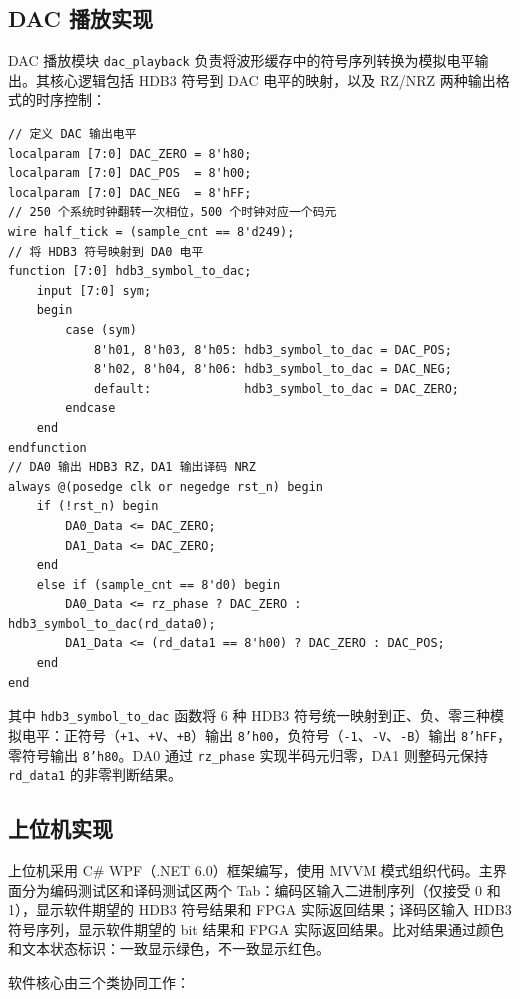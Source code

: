 \documentclass[UTF8,a4paper,12pt]{ctexart}
\begin{document}
\subsection{DAC 播放实现}

DAC 播放模块 \texttt{dac\_playback} 负责将波形缓存中的符号序列转换为模拟电平输出。其核心逻辑包括 HDB3 符号到 DAC 电平的映射，以及 RZ/NRZ 两种输出格式的时序控制：

\begin{lstlisting}[style=VerilogStyle,caption={DAC 码元播放与电平映射核心},label={lst:dac_core}]
// 定义 DAC 输出电平
localparam [7:0] DAC_ZERO = 8'h80;
localparam [7:0] DAC_POS  = 8'h00;
localparam [7:0] DAC_NEG  = 8'hFF;
// 250 个系统时钟翻转一次相位，500 个时钟对应一个码元
wire half_tick = (sample_cnt == 8'd249);
// 将 HDB3 符号映射到 DA0 电平
function [7:0] hdb3_symbol_to_dac;
    input [7:0] sym;
    begin
        case (sym)
            8'h01, 8'h03, 8'h05: hdb3_symbol_to_dac = DAC_POS;
            8'h02, 8'h04, 8'h06: hdb3_symbol_to_dac = DAC_NEG;
            default:             hdb3_symbol_to_dac = DAC_ZERO;
        endcase
    end
endfunction
// DA0 输出 HDB3 RZ，DA1 输出译码 NRZ
always @(posedge clk or negedge rst_n) begin
    if (!rst_n) begin
        DA0_Data <= DAC_ZERO;
        DA1_Data <= DAC_ZERO;
    end
    else if (sample_cnt == 8'd0) begin
        DA0_Data <= rz_phase ? DAC_ZERO : hdb3_symbol_to_dac(rd_data0);
        DA1_Data <= (rd_data1 == 8'h00) ? DAC_ZERO : DAC_POS;
    end
end
\end{lstlisting}

其中 \texttt{hdb3\_symbol\_to\_dac} 函数将 6 种 HDB3 符号统一映射到正、负、零三种模拟电平：正符号（\texttt{+1}、\texttt{+V}、\texttt{+B}）输出 \texttt{8'h00}，负符号（\texttt{-1}、\texttt{-V}、\texttt{-B}）输出 \texttt{8'hFF}，零符号输出 \texttt{8'h80}。DA0 通过 \texttt{rz\_phase} 实现半码元归零，DA1 则整码元保持 \texttt{rd\_data1} 的非零判断结果。


\subsection{上位机实现}

上位机采用 C\# WPF（.NET 6.0）框架编写，使用 MVVM 模式组织代码。主界面分为编码测试区和译码测试区两个 Tab：编码区输入二进制序列（仅接受 0 和 1），显示软件期望的 HDB3 符号结果和 FPGA 实际返回结果；译码区输入 HDB3 符号序列，显示软件期望的 bit 结果和 FPGA 实际返回结果。比对结果通过颜色和文本状态标识：一致显示绿色，不一致显示红色。

软件核心由三个类协同工作：
\end{document}
